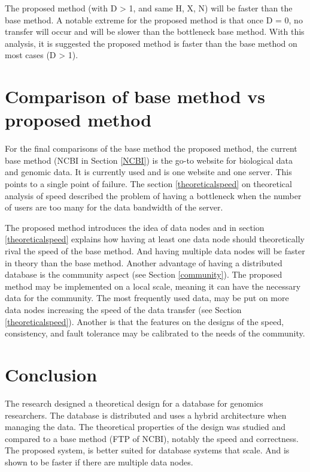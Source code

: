 \documentclass[acmsmall]{acmart}
\begin{document}
\begin{multicols}{2}
The proposed method (with D > 1, and same H, X, N) will be faster than the base method. A notable extreme for the proposed method is that once D = 0, no transfer will occur and will be slower than the bottleneck base method. With this analysis, it is suggested the proposed method is faster than the base method on most cases (D > 1). 

\section{Comparison of base method vs proposed method}

For the final comparisons of the base method the proposed method, the current base method (NCBI in Section \ref{NCBI}) is the go-to website for biological data and genomic data. It is currently used and is one website and one server. This points to a single point of failure\cite{seqtorr}. The section \ref{theoreticalspeed} on theoretical analysis of speed described the problem of having a bottleneck when the number of users are too many for the data bandwidth of the server. 

The proposed method introduces the idea of data nodes and in section \ref{theoreticalspeed} explains how having at least one data node should theoretically rival the speed of the base method. And having multiple data nodes will be faster in theory than the base method. Another advantage of having a distributed database is the community aspect (see Section \ref{community}). The proposed method may be implemented on a local scale, meaning it can have the necessary data for the community. The most frequently used data, may be put on more data nodes increasing the speed of the data transfer (see Section \ref{theoreticalspeed}). Another is that the features on the designs of the speed, consistency, and fault tolerance  may be calibrated to the needs of the community. 

\section{Conclusion}
The research designed a theoretical design for a database for genomics researchers. The database is distributed and uses a hybrid architecture when managing the data. The theoretical properties of the design was studied and compared to a base method (FTP of NCBI), notably the speed and correctness. The proposed system, is better suited for database systems that scale. And is shown to be faster if there are multiple data nodes.


\end{multicols}
\end{document}
